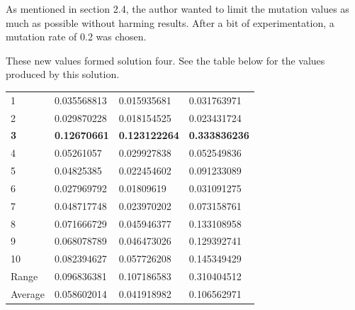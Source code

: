 \documentclass[sigconf]{acmart}
\begin{document}
As mentioned in section 2.4, the author wanted to limit the mutation values as much as possible without harming results. After a bit of experimentation, a mutation rate of 0.2 was chosen.

These new values formed solution four. See the table below for the values produced by this solution.

%
%
\begin{supertabular}{@{}p{0.1\columnwidth}p{0.25\columnwidth}p{0.25\columnwidth}p{0.25\columnwidth}}
    1&0.035568813&0.015935681&0.031763971\\
    2&0.029870228&0.018154525&0.023431724\\
    \textbf{3}&\textbf{0.12670661}&\textbf{0.123122264}&\textbf{0.333836236}\\
    4&0.05261057&0.029927838&0.052549836\\
    5&0.04825385&0.022454602&0.091233089\\
    6&0.027969792&0.01809619&0.031091275\\
    7&0.048717748&0.023970202&0.073158761\\
    8&0.071666729&0.045946377&0.133108958\\
    9&0.068078789&0.046473026&0.129392741\\
    10&0.082394627&0.057726208&0.145349429\\
    Range&0.096836381&0.107186583&0.310404512\\
    Average&0.058602014&0.041918982&0.106562971\\
    
\end{supertabular}%
\\
\end{document}
